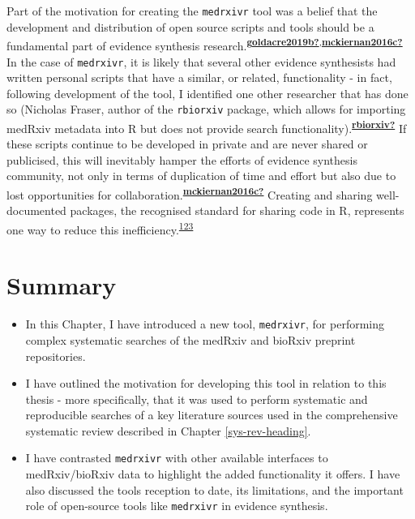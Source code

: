 \documentclass[a4paper, twoside]{templates/ociamthesis}
\begin{document}
Part of the motivation for creating the \texttt{medrxivr} tool was a belief that the development and distribution of open source scripts and tools should be a fundamental part of evidence synthesis research.\textsuperscript{\protect\hyperlink{ref-goldacre2019b}{\textbf{goldacre2019b?}},\protect\hyperlink{ref-mckiernan2016c}{\textbf{mckiernan2016c?}}} In the case of \texttt{medrxivr}, it is likely that several other evidence synthesists had written personal scripts that have a similar, or related, functionality - in fact, following development of the tool, I identified one other researcher that has done so (Nicholas Fraser, author of the \texttt{rbiorxiv} package, which allows for importing medRxiv metadata into R but does not provide search functionality).\textsuperscript{\protect\hyperlink{ref-rbiorxiv}{\textbf{rbiorxiv?}}} If these scripts continue to be developed in private and are never shared or publicised, this will inevitably hamper the efforts of evidence synthesis community, not only in terms of duplication of time and effort but also due to lost opportunities for collaboration.\textsuperscript{\protect\hyperlink{ref-mckiernan2016c}{\textbf{mckiernan2016c?}}} Creating and sharing well-documented packages, the recognised standard for sharing code in R, represents one way to reduce this inefficiency.\textsuperscript{\protect\hyperlink{ref-vuorre2020}{123}}

\hypertarget{summary-1}{%
\section{Summary}\label{summary-1}}

\begin{itemize}
\item
  In this Chapter, I have introduced a new tool, \texttt{medrxivr}, for performing complex systematic searches of the medRxiv and bioRxiv preprint repositories.
\item
  I have outlined the motivation for developing this tool in relation to this thesis - more specifically, that it was used to perform systematic and reproducible searches of a key literature sources used in the comprehensive systematic review described in Chapter \ref{sys-rev-heading}.
\item
  I have contrasted \texttt{medrxivr} with other available interfaces to medRxiv/bioRxiv data to highlight the added functionality it offers. I have also discussed the tools reception to date, its limitations, and the important role of open-source tools like \texttt{medrxivr} in evidence synthesis.
\end{itemize}
\end{document}
